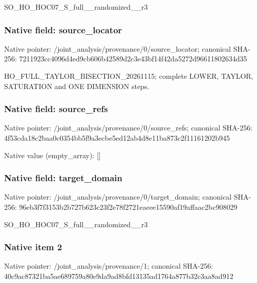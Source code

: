 \documentclass[10pt,a4paper]{article}
\begin{document}
\begingroup\raggedright\sloppy SO\_\allowbreak{}HO\_\allowbreak{}HOC07\_\allowbreak{}S\_\allowbreak{}full\_\allowbreak{}\_\allowbreak{}randomized\_\allowbreak{}\_\allowbreak{}r3\par\endgroup

\subsubsection{Native field: source\_\allowbreak{}locator}
Native pointer: /joint\_\allowbreak{}analysis/provenance/0/source\_\allowbreak{}locator; canonical SHA-256: 7211923cc4096d4ed9cb606b42589d2c3e43bf14f42da5272d96611802634d35

\begingroup\raggedright\sloppy HO\_\allowbreak{}FULL\_\allowbreak{}TAYLOR\_\allowbreak{}BISECTION\_\allowbreak{}20261115;\allowbreak{} complete LOWER,\allowbreak{} TAYLOR,\allowbreak{} SATURATION and ONE DIMENSION steps.\par\endgroup

\subsubsection{Native field: source\_\allowbreak{}refs}
Native pointer: /joint\_\allowbreak{}analysis/provenance/0/source\_\allowbreak{}refs; canonical SHA-256: 4f53cda18c2baa0c0354bb5f9a3ecbe5ed12ab4d8e11ba873c2f11161202b945

Native value (empty\_\allowbreak{}array): []

\subsubsection{Native field: target\_\allowbreak{}domain}
Native pointer: /joint\_\allowbreak{}analysis/provenance/0/target\_\allowbreak{}domain; canonical SHA-256: 96eb3f7f3153b2b727b623c23f2e78f2721eaeee15590af19affaac2bc908029

\begingroup\raggedright\sloppy SO\_\allowbreak{}HO\_\allowbreak{}HOC07\_\allowbreak{}S\_\allowbreak{}full\_\allowbreak{}\_\allowbreak{}randomized\_\allowbreak{}\_\allowbreak{}r3\par\endgroup

\subsubsection{Native item 2}
Native pointer: /joint\_\allowbreak{}analysis/provenance/1; canonical SHA-256: 40c9ac87321ba5ae689759a80e9da9ad8bfd13135ad1764a877b32c3aa8ad912
\end{document}
